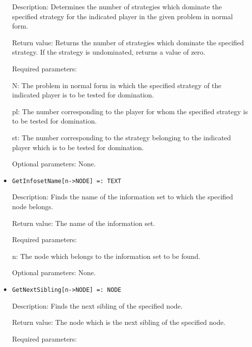 \begin{itemize}
\bd
\item
[Description:] Determines the number of strategies which dominate the
specified strategy for the indicated player in the given problem in
normal form.
\item
[Return value:] Returns the number of strategies which dominate the
specified strategy.  If the strategy is undominated, returns a value
of zero.
\item
[Required parameters:]\hfil\null

\bd
\item
[N:] The problem in normal form in which the specified strategy of the
indicated player is to be tested for domination.
\item
[pl:] The number corresponding to the player for whom the specified
strategy is to be tested for domination.
\item
[st:] The number corresponding to the strategy belonging to the
indicated player which is to be tested for domination.
\ed

\item
[Optional parameters:] None.
\ed

\item
\protect \large \begin{verbatim}
GetInfosetName[n->NODE] =: TEXT
\end{verbatim}\normalsize

\bd
\item
[Description:] Finds the name of the information set to which the
specified node belongs.
\item
[Return value:] The name of the information set.
\item
[Required parameters:]\hfil\null

\bd
\item
[n:] The node which belongs to the information set to be found.
\ed

\item
[Optional parameters:] None.
\ed

\item
\protect \large \begin{verbatim}
GetNextSibling[n->NODE] =: NODE
\end{verbatim}\normalsize

\bd
\item
[Description:] Finds the next sibling of the specified node.
\item
[Return value:] The node which is the next sibling of the specified
node.
\item
[Required parameters:]\hfil\null


\end{itemize}
